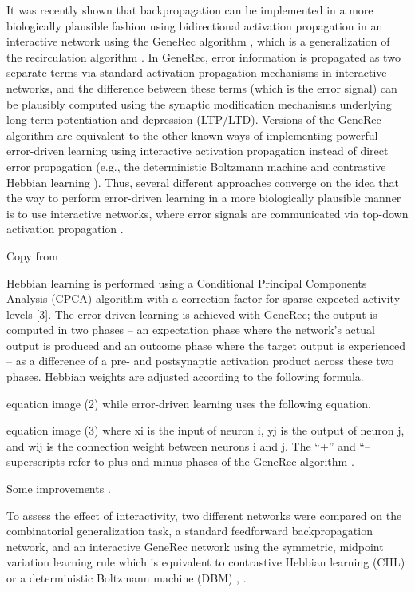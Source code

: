 It was recently shown that backpropagation can be implemented in a more biologically plausible fashion using bidirectional activation propagation in an interactive network using the GeneRec algorithm \cite{o1996bio}, which is a generalization of the recirculation algorithm \cite{hinton1988learning}. In GeneRec, error information is propagated as two separate terms via standard activation propagation mechanisms in interactive networks, and the difference between these terms (which is the error signal) can be plausibly computed using the synaptic modification mechanisms underlying long term potentiation and depression (LTP/LTD). Versions of the GeneRec algorithm are equivalent to the other known ways of implementing powerful error-driven learning using interactive activation propagation instead of direct error propagation (e.g., the deterministic Boltzmann machine \cite{hinton1989deterministic} and contrastive Hebbian learning \cite{movellan1990contrastive}). Thus, several different approaches converge on the idea that the way to perform error-driven learning in a more biologically plausible manner is to use interactive networks, where error signals are communicated via top-down activation propagation \cite{o2001generalization}.

Copy from \cite{da2011advances} 


Hebbian learning is performed using a Conditional Principal Components Analysis (CPCA) algorithm with a correction factor for sparse expected activity levels [3]. The error-driven learning is achieved with GeneRec; the output is computed in two phases – an expectation phase where the network's actual output is produced and an outcome phase where the target output is experienced – as a difference of a pre- and postsynaptic activation product across these two phases. Hebbian weights are adjusted according to the following formula.

equation image	(2)
while error-driven learning uses the following equation.

equation image	(3)
where xi is the input of neuron i, yj is the output of neuron j, and wij is the connection weight between neurons i and j. The “+” and “– superscripts refer to plus and minus phases of the GeneRec algorithm \cite{nawrocki2012monitoring}.

Some improvements \cite{da2008biological}. 

To assess the effect of interactivity, two different networks were compared on the combinatorial generalization task, a standard feedforward backpropagation network, and an interactive GeneRec network using the symmetric, midpoint variation learning rule which is equivalent to contrastive Hebbian learning (CHL) or a deterministic Boltzmann machine (DBM) \cite{o1996bio}, \cite{o2001generalization}. 

